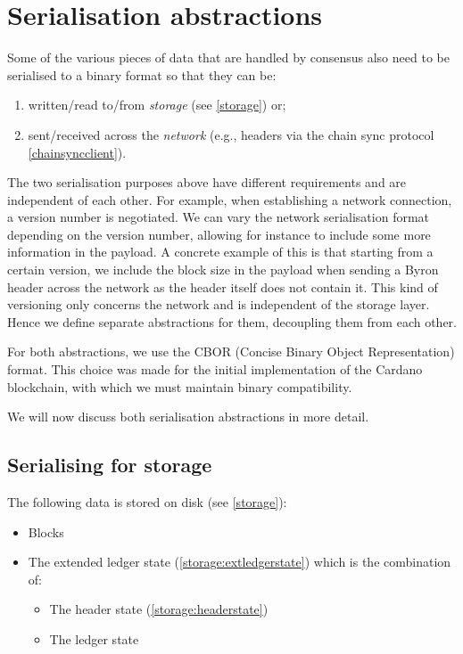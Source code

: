 \chapter{Serialisation abstractions}
\label{serialisation}

Some of the various pieces of data that are handled by consensus also need to be
serialised to a binary format so that they can be:

\begin{enumerate}
\item written/read to/from \emph{storage} (see \cref{storage}) or;
\item sent/received across the \emph{network} (e.g., headers via the chain sync
  protocol \cref{chainsyncclient}).
\end{enumerate}

The two serialisation purposes above have different requirements and are
independent of each other. For example, when establishing a network connection,
a version number is negotiated. We can vary the network serialisation format
depending on the version number, allowing for instance to include some more
information in the payload. A concrete example of this is that starting from a
certain version, we include the block size in the payload when sending a Byron
header across the network as the header itself does not contain it. This kind of
versioning only concerns the network and is independent of the storage layer.
Hence we define separate abstractions for them, decoupling them from each other.

For both abstractions, we use the CBOR (Concise Binary Object Representation)
format. This choice was made for the initial implementation of the Cardano
blockchain, with which we must maintain binary compatibility.

We will now discuss both serialisation abstractions in more detail.

\section{Serialising for storage}
\label{serialisation:storage}

The following data is stored on disk (see \cref{storage}):

\begin{itemize}
\item Blocks
\item The extended ledger state (\cref{storage:extledgerstate}) which is the
  combination of:
  \begin{itemize}
  \item The header state (\cref{storage:headerstate})
  \item The ledger state %
  \end{itemize}
\end{itemize}

